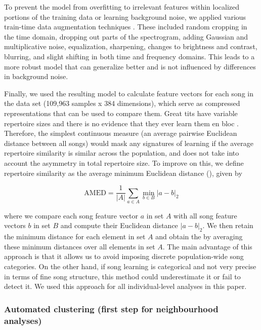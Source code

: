 \documentclass[9pt, onecolumn, twoside, lineno]{gsajnl}
\begin{document}
To prevent the model from overfitting to irrelevant features within localized portions of the training data or learning background noise, we applied various train-time data augmentation techniques \autocite{mumuni2022,perez2017,shorten2019}. These included random cropping in the time domain, dropping out parts of the spectrogram, adding Gaussian and multiplicative noise, equalization, sharpening, changes to brightness and contrast, blurring, and slight shifting in both time and frequency domains. This leads to a more robust model that can generalize better and is not influenced by differences in background noise.

Finally, we used the resulting model to calculate feature vectors for each song in the data set (109,963 samples x 384 dimensions), which serve as compressed representations that can be used to compare them. Great tits have variable repertoire sizes and there is no evidence that they ever learn them en bloc \autocite{mcgregor1982b, rivera-gutierrez2010a}. Therefore, the simplest continuous measure (an average pairwise Euclidean distance between all songs) would mask any signatures of learning if the average repertoire similarity is similar across the population, and does not take into account the asymmetry in total repertoire size. To improve on this, we define repertoire similarity as the average minimum Euclidean distance (), given by

\begin{equation} 
\label{eq1}
\text{AMED} = \frac{1}{|A|} \sum_{a \in A} \min_{b \in B} \left| a - b \right|_2
\end{equation}

where we compare each song feature vector $a$ in set $A$ with all song feature vectors $b$ in set $B$ and compute their Euclidean distance $\left| a - b \right|_2$. We then retain the minimum distance for each element in set $A$ and obtain the  by averaging these minimum distances over all elements in set $A$.
The main advantage of this approach is that it allows us to avoid imposing discrete population-wide song categories. On the other hand, if song learning is categorical and not very precise in terms of fine song structure, this method could underestimate it or fail to detect it. We used this approach for all individual-level analyses in this paper. 

\subsubsection{Automated clustering (first step for neighbourhood analyses)}
\end{document}
